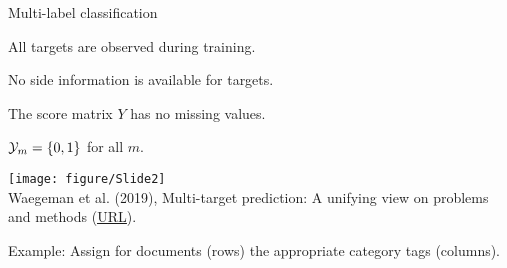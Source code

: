 \documentclass[11pt,compress,t,notes=noshow, xcolor=table]{beamer}
\begin{document}
\begin{frame}{Multi-label classification}
	\small
	\begin{itemize}
		\small 

        \begin{minipage}{0.45\textwidth}  
            \item All targets are observed during training.
            \vspace{10pt}
            
            \item No side information is available for targets. 
            \vspace{10pt}
            
			\item The score matrix $Y$ has no missing values. 	
            \vspace{10pt}
			\item $\mathcal{Y}_m = \{0,1\}$ for all $m$.	
		\end{minipage}
        \hfill
		\begin{minipage}{0.45\textwidth}    
		\begin{center}
			\texttt{[image: figure/Slide2]} \tiny
			\\ Waegeman et al. (2019), Multi-target prediction:
			A unifying view on problems and methods (\href{https://arxiv.org/pdf/1809.02352.pdf}{\underline{URL}}).
		\end{center}
		\end{minipage}
	\end{itemize}	

    \vspace{10pt}
	Example: Assign for documents (rows) the appropriate category tags (columns).

\end{frame}
\end{document}
